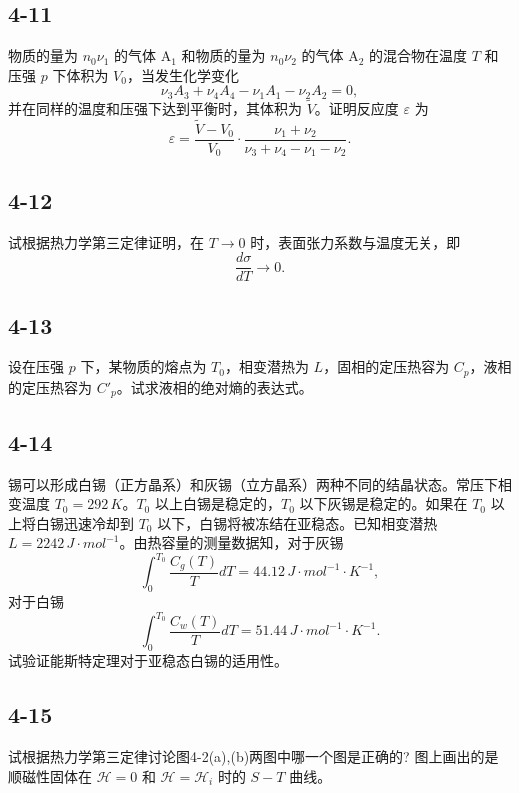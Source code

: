 \newpage
\subsection{4-11}
物质的量为 $n_0 \nu_1$ 的气体 A$_1$ 和物质的量为 $n_0 \nu_2$ 的气体 A$_2$ 的混合物在温度 $T$ 和压强 $p$ 下体积为 $V_0$，当发生化学变化
$$ \nu_3 A_3 + \nu_4 A_4 - \nu_1 A_1 - \nu_2 A_2 = 0, $$
并在同样的温度和压强下达到平衡时，其体积为 $\widetilde{V}$。证明反应度 $\varepsilon$ 为
$$ \varepsilon = \frac{\widetilde{V} - V_0}{V_0} \cdot \frac{\nu_1 + \nu_2}{\nu_3 + \nu_4 - \nu_1 - \nu_2}. $$

\newpage
\subsection{4-12}
试根据热力学第三定律证明，在 $T \to 0$ 时，表面张力系数与温度无关，即
$$ \frac{d\sigma}{dT} \to 0. $$

\newpage
\subsection{4-13}
设在压强 $p$ 下，某物质的熔点为 $T_0$，相变潜热为 $L$，固相的定压热容为 $C_p$，液相的定压热容为 $C'_p$。试求液相的绝对熵的表达式。

\newpage
\subsection{4-14}
锡可以形成白锡（正方晶系）和灰锡（立方晶系）两种不同的结晶状态。常压下相变温度 $T_0 = 292 \, K$。$T_0$ 以上白锡是稳定的，$T_0$ 以下灰锡是稳定的。如果在 $T_0$ 以上将白锡迅速冷却到 $T_0$ 以下，白锡将被冻结在亚稳态。已知相变潜热 $L = 2242 \, J \cdot mol^{-1}$。由热容量的测量数据知，对于灰锡
$$ \int_0^{T_0} \frac{C_g(T)}{T} dT = 44.12 \, J \cdot mol^{-1} \cdot K^{-1}, $$
对于白锡
$$ \int_0^{T_0} \frac{C_w(T)}{T} dT = 51.44 \, J \cdot mol^{-1} \cdot K^{-1}. $$
试验证能斯特定理对于亚稳态白锡的适用性。

\newpage
\subsection{4-15}
试根据热力学第三定律讨论图4-2(a),(b)两图中哪一个图是正确的? 图上画出的是顺磁性固体在 $\mathcal{H}=0$ 和 $\mathcal{H}=\mathcal{H}_i$ 时的 $S-T$ 曲线。


